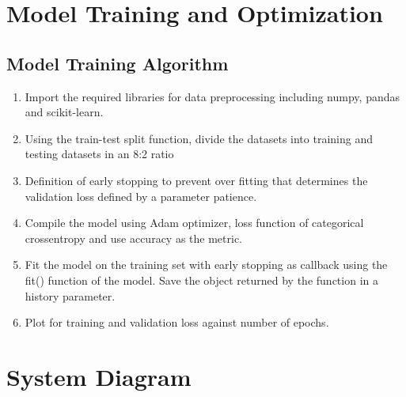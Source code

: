 \section{Model Training and Optimization}
\vspace{-18pt}
\subsection{Model Training Algorithm}
\vspace{-18pt}
\begin{enumerate}[label=\roman*.]
	\item Import the required libraries for data preprocessing including numpy, pandas and scikit-learn.
	\item Using the train-test split function, divide the datasets into training and testing datasets in an 8:2 ratio
	\item Definition of early stopping to prevent over fitting that determines the validation loss defined by a parameter patience.
	\item Compile the model using Adam optimizer, loss function of categorical crossentropy and use accuracy as the metric.
	\item Fit the model on the training set with early stopping as callback using the fit() function of the model. Save the object returned by the function in a history parameter.
	\item  Plot for training and validation loss against number of epochs.
\end{enumerate}
\section{System Diagram}
\vspace{-18pt}
